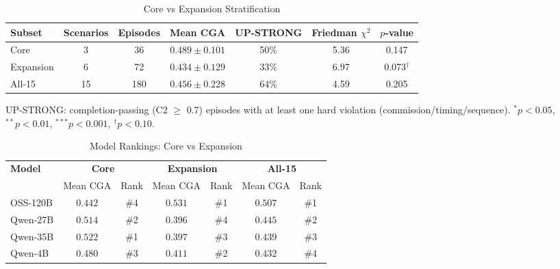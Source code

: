 \begin{table}[htbp]
\centering
\caption{Core vs Expansion Stratification}
\label{tab:core_vs_expansion}
\small
\begin{tabular}{lcccccc}
\hline
\textbf{Subset} & \textbf{Scenarios} & \textbf{Episodes} & \textbf{Mean CGA} & \textbf{UP-STRONG} & \textbf{Friedman $\chi^2$} & \textbf{$p$-value} \\
\hline
Core & 3 & 36 & $0.489 \pm 0.101$ & 50\% & 5.36 & 0.147 \\
Expansion & 6 & 72 & $0.434 \pm 0.129$ & 33\% & 6.97 & 0.073$^{†}$ \\
All-15 & 15 & 180 & $0.456 \pm 0.228$ & 64\% & 4.59 & 0.205 \\
\hline
\end{tabular}
\vspace{0.5em}
\begin{minipage}{\linewidth}
\footnotesize UP-STRONG: completion-passing (C2 $\geq$ 0.7) episodes with at least one hard violation (commission/timing/sequence). $^{*}p<0.05$, $^{**}p<0.01$, $^{***}p<0.001$, $^{\dagger}p<0.10$.
\end{minipage}
\end{table}

\begin{table}[htbp]
\centering
\caption{Model Rankings: Core vs Expansion}
\label{tab:core_vs_expansion_ranks}
\small
\begin{tabular}{lcccccc}
\hline
\textbf{Model} & \multicolumn{2}{c}{\textbf{Core}} & \multicolumn{2}{c}{\textbf{Expansion}} & \multicolumn{2}{c}{\textbf{All-15}} \\
 & Mean CGA & Rank & Mean CGA & Rank & Mean CGA & Rank \\
\hline
OSS-120B & $0.442$ & \#4 & $0.531$ & \#1 & $0.507$ & \#1 \\
Qwen-27B & $0.514$ & \#2 & $0.396$ & \#4 & $0.445$ & \#2 \\
Qwen-35B & $0.522$ & \#1 & $0.397$ & \#3 & $0.439$ & \#3 \\
Qwen-4B & $0.480$ & \#3 & $0.411$ & \#2 & $0.432$ & \#4 \\
\hline
\end{tabular}
\end{table}